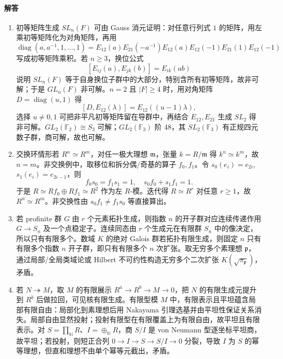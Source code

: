 \documentclass[UTF8,12pt]{ctexart}
\begin{document}
\paragraph{解答}
\begin{enumerate}[label=\textbf{\arabic*.},leftmargin=2.2em]
\item 初等矩阵生成 \(SL_n(F)\) 可由 Gauss 消元证明：对任意行列式 \(1\) 的矩阵，用左乘初等矩阵化为对角矩阵，再用
\[
\operatorname{diag}(a,a^{-1},1,\ldots,1)
=E_{12}(a)E_{21}(-a^{-1})E_{12}(a)E_{12}(-1)E_{21}(1)E_{12}(-1)
\]
写成初等矩阵乘积。若 \(n\ge3\)，换位公式
\[
[E_{ij}(a),E_{jk}(b)]=E_{ik}(ab)
\]
说明 \(SL_n(F)\) 等于自身换位子群中的大部分，特别含所有初等矩阵，故非可解；于是 \(GL_n(F)\) 非可解。\(n=2\) 且 \(|F|\ge4\) 时，用对角矩阵 \(D=\operatorname{diag}(u,1)\) 得
\[
[D,E_{12}(\lambda)]=E_{12}((u-1)\lambda),
\]
选择 \(u\ne0,1\) 可把非平凡初等矩阵留在导群中，再结合 \(E_{12},E_{21}\) 生成 \(SL_2\) 得非可解。\(GL_2(\mathbb F_2)\cong S_3\) 可解；\(GL_2(\mathbb F_3)\) 阶 \(48\)，其 \(SL_2(\mathbb F_3)\) 有正规四元数子群，商可解，故也可解。
\item 交换环情形若 \(R^n\simeq R^m\)，对任一极大理想 \(\mathfrak m\)，张量 \(k=R/\mathfrak m\) 得 \(k^n\simeq k^m\)，故 \(n=m\)。非交换例中，取移位和拆分偶/奇基的算子 \(f_0,f_1\)。令 \(s_0(e_i)=e_{2i}\), \(s_1(e_i)=e_{2i-1}\)，则
\[
f_0s_0=f_1s_1=1,\quad s_0f_0+s_1f_1=1.
\]
于是 \(R\simeq Rf_0\oplus Rf_1\simeq R^2\) 作为左 \(R\)-模。迭代得 \(R\simeq R^r\) 对任意 \(r\ge1\)，故 \(R^n\simeq R^m\)。非交换性由 \(s_0f_1\ne f_1s_0\) 等直接算出。
\item 若 profinite 群 \(G\) 由 \(r\) 个元素拓扑生成，则指数 \(n\) 的开子群对应连续传递作用 \(G\to S_n\) 及一个点稳定子。连续同态由 \(r\) 个生成元在有限群 \(S_n\) 中的像决定，所以只有有限多个。数域 \(K\) 的绝对 Galois 群若拓扑有限生成，则固定 \(n\) 只有有限多个指数 \(n\) 开子群，即只有有限多个 \(n\) 次扩张。取无穷多个素理想 \(\mathfrak p\)，通过局部/全局类域论或 Hilbert 不可约性构造无穷多个二次扩张 \(K(\sqrt{\pi_\mathfrak p})\)，矛盾。
\item 若 \(N\twoheadrightarrow M\)，取 \(M\) 的有限展示 \(R^a\to R^b\to M\to0\)，把 \(N\) 的有限生成元提升到 \(R^b\) 后做拉回，可见核有限生成。有限型模 \(M\) 中，有限表示且平坦蕴含局部有限自由：局部化到素理想后用 Nakayama 引理选基并由平坦性保证关系消失。局部自由显然投射；投射有限型在有限覆盖上为有限自由，故平坦且有限表示。对 \(S=\prod_\mathbb N R\)、\(I=\oplus_\mathbb N R\)，商 \(S/I\) 是 von Neumann 型逐坐标平坦商，故平坦；若投射，则短正合列 \(0\to I\to S\to S/I\to0\) 分裂，导致 \(I\) 为 \(S\) 的幂等理想，但直和理想不由单个幂等元截出，矛盾。

\end{enumerate}
\end{document}
